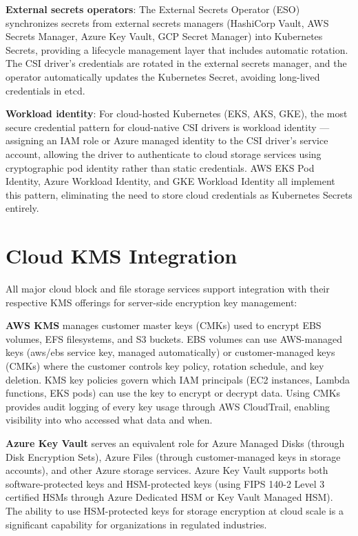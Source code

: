 \textbf{External secrets operators}: The External Secrets Operator (ESO) synchronizes secrets from external secrets managers (HashiCorp Vault, AWS Secrets Manager, Azure Key Vault, GCP Secret Manager) into Kubernetes Secrets, providing a lifecycle management layer that includes automatic rotation. The CSI driver's credentials are rotated in the external secrets manager, and the operator automatically updates the Kubernetes Secret, avoiding long-lived credentials in etcd.

\textbf{Workload identity}: For cloud-hosted Kubernetes (EKS, AKS, GKE), the most secure credential pattern for cloud-native CSI drivers is workload identity --- assigning an IAM role or Azure managed identity to the CSI driver's service account, allowing the driver to authenticate to cloud storage services using cryptographic pod identity rather than static credentials. AWS EKS Pod Identity, Azure Workload Identity, and GKE Workload Identity all implement this pattern, eliminating the need to store cloud credentials as Kubernetes Secrets entirely.

\section{Cloud KMS Integration}
All major cloud block and file storage services support integration with their respective KMS offerings for server-side encryption key management:

\textbf{AWS KMS} manages customer master keys (CMKs) used to encrypt EBS volumes, EFS filesystems, and S3 buckets. EBS volumes can use AWS-managed keys (aws/ebs service key, managed automatically) or customer-managed keys (CMKs) where the customer controls key policy, rotation schedule, and key deletion. KMS key policies govern which IAM principals (EC2 instances, Lambda functions, EKS pods) can use the key to encrypt or decrypt data. Using CMKs provides audit logging of every key usage through AWS CloudTrail, enabling visibility into who accessed what data and when.

\textbf{Azure Key Vault} serves an equivalent role for Azure Managed Disks (through Disk Encryption Sets), Azure Files (through customer-managed keys in storage accounts), and other Azure storage services. Azure Key Vault supports both software-protected keys and HSM-protected keys (using FIPS 140-2 Level 3 certified HSMs through Azure Dedicated HSM or Key Vault Managed HSM). The ability to use HSM-protected keys for storage encryption at cloud scale is a significant capability for organizations in regulated industries.

